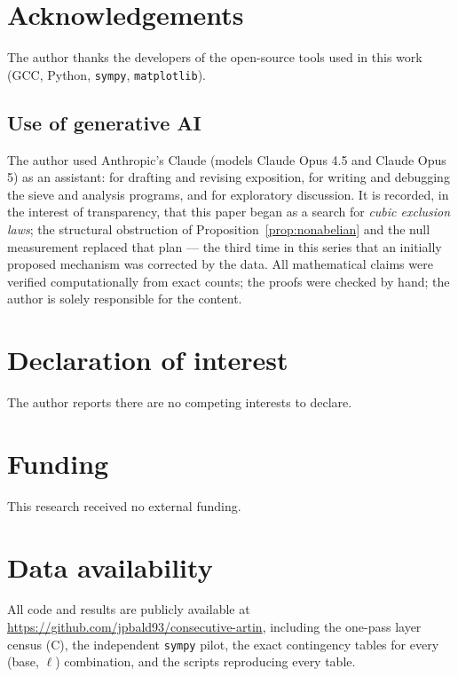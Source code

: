 \documentclass[11pt,reqno]{amsart}
\theoremstyle{plain}
\theoremstyle{definition}
\begin{document}
\section*{Acknowledgements}
The author thanks the developers of the open-source tools used in this work
(GCC, Python, \texttt{sympy}, \texttt{matplotlib}).

\subsection*{Use of generative AI}
The author used Anthropic's Claude (models Claude Opus 4.5 and Claude
Opus 5) as an assistant: for drafting and revising exposition, for writing
and debugging the sieve and analysis programs, and for exploratory
discussion. It is recorded, in the interest of transparency, that this paper
began as a search for \emph{cubic exclusion laws}; the structural obstruction
of Proposition~\ref{prop:nonabelian} and the null measurement replaced that
plan --- the third time in this series that an initially proposed mechanism
was corrected by the data. All mathematical claims were verified
computationally from exact counts; the proofs were checked by hand; the
author is solely responsible for the content.

\section*{Declaration of interest}
The author reports there are no competing interests to declare.

\section*{Funding}
This research received no external funding.

\section*{Data availability}
All code and results are publicly available at
\url{https://github.com/jpbald93/consecutive-artin}, including the one-pass
layer census (C), the independent \texttt{sympy} pilot, the exact
contingency tables for every (base, $\ell$) combination, and the scripts
reproducing every table.
\end{document}
